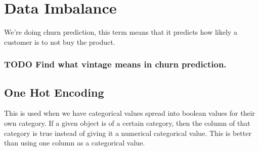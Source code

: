 \documentclass[11pt]{article}
\begin{document}
\section{Data Imbalance}
\label{sec:orgd729b7d}
We're doing churn prediction, this term means that it predicts how likely a customer is to not buy the product.
\subsubsection{{\bfseries\sffamily TODO} Find what vintage means in churn prediction.}
\label{sec:orgcc28a08}
\subsection{One Hot Encoding}
\label{sec:orgda58a3a}
This is used when we have categorical values spread into boolean values for their own category. If a given object is of a certain category, then the column of that category is true instead of giving it a numerical categorical value. This is better than using one column as a categorical value.
\end{document}
